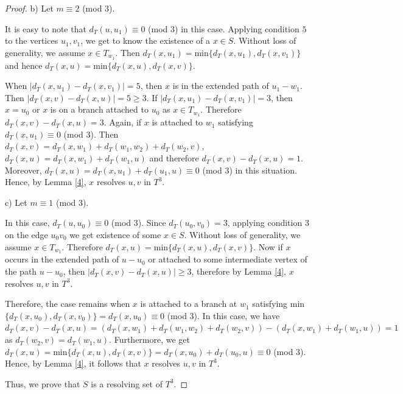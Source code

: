 \documentclass{article}
\theoremstyle{definition}
\numberwithin{equation}{section}
\begin{document}
\begin{proof}
\vspace{0.7em}
\noindent  b) Let $m\equiv 2$ (mod $3$).
\vspace{0.3em}

It is easy to note that $d_{T}(u,u_{1})\equiv 0$ (mod $3$) in this case. Applying condition $5$ to the vertices $u_{1},v_{1}$, we get to know the existence of a $x\in S$. Without loss of generality, we assume $x\in T_{w_{1}}$. Then $d_{T}(x,u_{1})=\text{min}\{d_{T}(x,u_{1}),d_{T}(x,v_{1})\}$ and hence $d_{T}(x,u)=\text{min}\{d_{T}(x,u),d_{T}(x,v)\}$. 


\vspace{0.3em}
When $|d_{T}(x,u_{1})-d_{T}(x,v_{1})|=5$, then $x$ is in the extended path of $u_{1}-w_{1}$. Then $|d_{T}(x,v)-d_{T}(x,u)|=5\geq3$. If $|d_{T}(x,u_{1})-d_{T}(x,v_{1})|=3$, then $x=u_{0}$ or $x$ is on a branch attached to $u_{0}$ as $x\in T_{w_{1}}$. Therefore $d_{T}(x,v)-d_{T}(x,u)=3$. 
Again, if $x$ is attached to $w_{1}$ satisfying $d_{T}(x,u_{1})\equiv 0$ (mod $3$). Then $d_{T}(x,v)= d_{T}(x,w_{1})+d_{T}(w_{1},w_{2})+d_{T}(w_{2},v)$, $d_{T}(x,u)=d_{T}(x,w_{1})+d_{T}(w_{1},u)$ and therefore $d_{T}(x,v)-d_{T}(x,u)=1$. Moreover, $d_{T}(x,u)=d_{T}(x,u_{1})+d_{T}(u_{1},u)\equiv 0$ (mod $3$) in this situation. Hence, by Lemma \ref{4}, $x$ resolves $u,v$ in $T^{3}$.

\vspace{0.6em}
\noindent c) Let $m\equiv 1$ (mod $3$).

\vspace{0.3em}
In this case, $d_{T}(u,u_{0})\equiv 0$ (mod $3$). Since $d_{T}(u_{0},v_{0})=3$, applying condition $3$ on the edge $u_{0}v_{0}$ we get existence of some $x\in S$. Without loss of generality, we assume $x\in T_{w_{1}}$. Therefore $d_{T}(x,u)=\text{min}\{d_{T}(x,u),d_{T}(x,v)\}$. Now if $x$ occurs in the extended path of $u-u_{0}$ or attached to some intermediate vertex of the path $u-u_{0}$, then $|d_{T}(x,v)-d_{T}(x,u)|\geq 3$, therefore by Lemma \ref{4}, $x$ resolves $u,v$ in $T^{3}$.

\vspace{0.3em}
\noindent Therefore, the case remains when $x$ is attached to a branch at $w_{1}$ satisfying min $\{d_{T}(x,u_{0}),d_{T}(x,v_{0})\}=d_{T}(x,u_{0})\equiv 0$ (mod $3$). In this case, we have $d_{T}(x,v)-d_{T}(x,u)= (d_{T}(x,w_{1})+d_{T}(w_{1},w_{2})+d_{T}(w_{2},v))-(d_{T}(x,w_{1})+d_{T}(w_{1},u))=1$ as $d_{T}(w_{2},v)=d_{T}(w_{1},u)$. Furthermore, we get $d_{T}(x,u)=\mbox{min}\{d_{T}(x,u),d_{T}(x,v)\}=d_{T}(x,u_{0})+d_{T}(u_{0},u)\equiv 0$ (mod $3$). Hence, by Lemma \ref{4}, it follows that $x$ resolves $u,v$ in $T^{3}$.  
\vspace{0.7em}

\noindent Thus, we prove that $S$ is a resolving set of $T^{3}$.
\end{proof}
\end{document}
